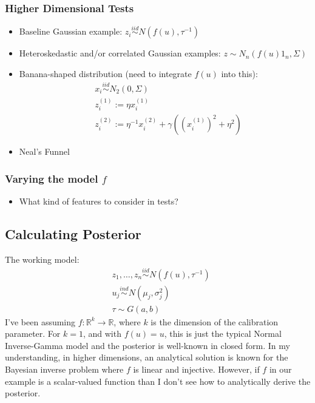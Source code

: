 \documentclass[12pt]{article}
\newcommand{\R}{\mathcal{R}}
\def\R{\mathbb{R}}
\begin{document}
\subsubsection{Higher Dimensional Tests}
\begin{itemize}
\item Baseline Gaussian example: $z_i \overset{iid}{\sim} N(f(u), \tau^{-1})$
\item Heteroskedastic and/or correlated Gaussian examples: $z \sim N_n(f(u)1_n, \Sigma)$
\item Banana-shaped distribution (need to integrate $f(u)$ into this): 
\begin{align*}
&x_i \overset{iid}{\sim} N_2(0, \Sigma) \\
&z_i^{(1)} := \eta x_i^{(1)} \\
&z_i^{(2)} := \eta^{-1} x_i^{(2)} + \gamma((x_i^{(1)})^2 + \eta^2)
\end{align*}
\item Neal's Funnel
\end{itemize}

\subsubsection{Varying the model $f$}
\begin{itemize}
\item What kind of features to consider in tests?
\end{itemize}

\subsection{Calculating Posterior}
The working model:
\begin{align*}
&z_1, \dots, z_n \overset{iid}{\sim} N(f(u), \tau^{-1}) \\
&u_j \overset{ind}{\sim} N(\mu_j, \sigma_j^2) \\
&\tau \sim G(a, b)
\end{align*}
I've been assuming $f: \R^k \to \R$, where $k$ is the dimension of the calibration parameter. 
For $k = 1$, and with $f(u) = u$, this is just the typical Normal Inverse-Gamma model and the posterior 
is well-known in closed form. In my understanding, in higher dimensions, an analytical solution is known 
for the Bayesian inverse problem where $f$ is linear and injective. However, if $f$ in our example is a scalar-valued
function than I don't see how to analytically derive the posterior. 
\end{document}
